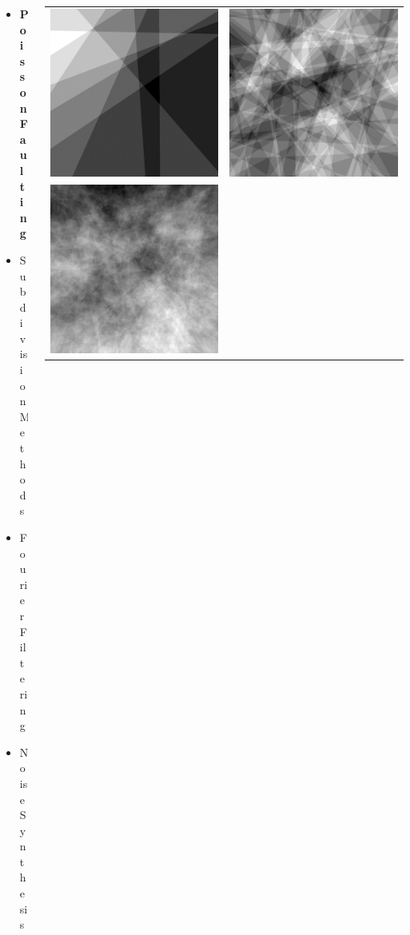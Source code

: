 \documentclass[aspectratio=169]{beamer}
\newenvironment{myframe}[1][t]{\begin{frame}[#1]{\secname}{\subsecname}}{\end{frame}}
\begin{document}
	\begin{myframe}
		\begin{columns}[T]
			\begin{column}{0.45\linewidth}
				\begin{itemize}
					\item \textbf{Poisson Faulting}
					\item Subdivision Methods
					\item Fourier Filtering
					\item Noise Synthesis
				\end{itemize}
			\end{column}
			
			\begin{column}{0.5\linewidth}
				\vspace{-1.5em}
				\begin{tabular}{lr}
					\includegraphics[width=0.35\linewidth]{images/background/generation/plane10} &
					\includegraphics[width=0.35\linewidth]{images/background/generation/plane100} \\
					\includegraphics[width=0.35\linewidth]{images/background/generation/plane1000} &

\end{tabular}
\end{column}
\end{columns}
\end{myframe}
\end{document}
